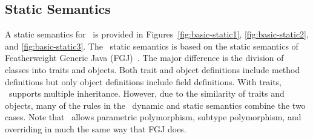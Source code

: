 %
%
%
%

\subsection{Static Semantics}\label{basic-static}
A static semantics for \basiccore\ is provided in
Figures~\ref{fig:basic-static1}, \ref{fig:basic-static2}, and
\ref{fig:basic-static3}.
The \basiccore\ static semantics is based on the static
semantics of Featherweight Generic Java (FGJ)~\cite{fgj}. The major
difference is the division of classes into traits and objects. 
Both trait and object definitions
include method definitions but only object definitions include field
definitions. With traits, \basiccore\ supports multiple inheritance.
However, due to the similarity of traits and objects, many of the rules
in the \basiccore\ dynamic and static semantics combine
the two cases.  Note that \basiccore\ allows parametric 
polymorphism, subtype polymorphism, and overriding in much the
same way that FGJ does.

